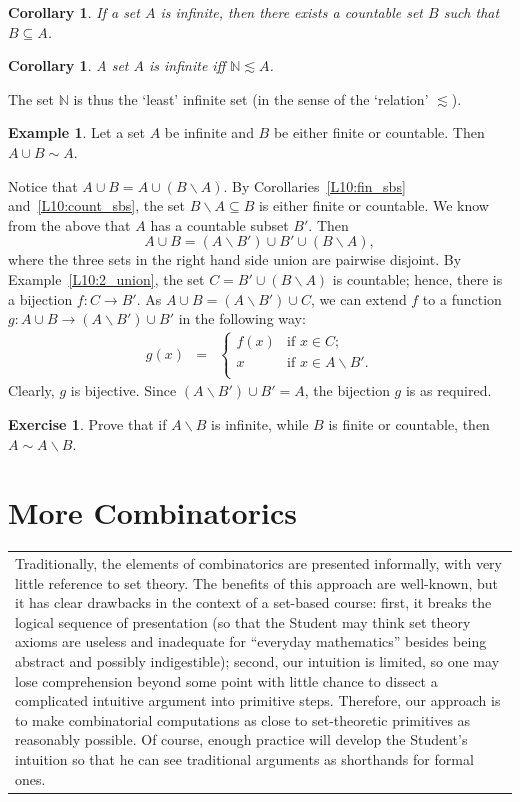 \documentclass[12pt,notitlepage]{article}
\theoremstyle{plain}
\newtheorem{corr}[thm]{Corollary}
\theoremstyle{definition}
\newtheorem{exc}[thm]{Exercise}
\newtheorem{exm}[thm]{Example}
\theoremstyle{plain}
\newcommand{\N}{\mathbb{N}}
\newcommand{\sbs}{\subseteq}
\renewcommand{\setminus}{\smallsetminus}
\newcommand{\1}{\mathbf{1}}
\newcommand{\0}{\mathbf{0}}
\newcommand{\mcomm}[1]{
\medskip\noindent\begin{tabular}{| l}
\parbox{0.99\textwidth}{{\small
#1 }}\end{tabular}
\smallskip}
\begin{document}
\begin{corr}
If a set $A$ is infinite, then there exists a countable set $B$ such that $B \sbs A$.
\end{corr}

\begin{corr}\label{L10:min_inf_corr}
A set $A$ is infinite iff $\N \lesssim A$.
\end{corr}
\noindent The set $\N$ is thus the `least' infinite set (in the sense of the `relation' ${\lesssim}$).

\begin{exm}
Let a set $A$ be infinite and $B$ be either finite or countable. Then $A \cup B \sim A$.

Notice that $A \cup B = A \cup (B \setminus A)$. By Corollaries~\ref{L10:fin_sbs} and~\ref{L10:count_sbs}, the set $B \setminus A \sbs B$ is either finite or countable. We know from the above that $A$ has a countable subset $B'$. Then
$$A \cup B = (A \setminus B') \cup B' \cup (B \setminus A),$$
where the three sets in the right hand side union are pairwise disjoint. By Example~\ref{L10:2_union}, the set $C = B' \cup (B \setminus A)$ is countable; hence, there is a bijection $f\colon C \to B'$. As $A \cup B = (A \setminus B') \cup C$, we can extend $f$ to a function $g\colon A \cup B \to (A \setminus B') \cup B'$ in the following way:
$$
\begin{array}{rcll}
g(x) &=& \begin{cases}
			f(x)&\mbox{if } x \in C;\\
			x&\mbox{if } x \in A \setminus B'.\\
		\end{cases}
\end{array}
$$
Clearly, $g$ is bijective. Since $(A \setminus B') \cup B' = A$, the bijection $g$ is as required.
\end{exm}

\begin{exc}
Prove that if $A \setminus B$ is infinite, while $B$ is finite or countable, then $A \sim A \setminus B$.
\end{exc}

\section{More Combinatorics}
\mcomm{Traditionally, the elements of combinatorics are presented informally, with very little reference to set theory. The benefits of this approach are well-known, but it has clear drawbacks in the context of a set-based course: first, it breaks the logical sequence of presentation (so that the Student may think set theory axioms are useless and inadequate for ``everyday mathematics'' besides being abstract and possibly indigestible); second, our intuition is limited, so one may lose comprehension beyond some point with little chance to dissect a complicated intuitive argument into primitive steps. Therefore, our approach is to make combinatorial computations as close to set-theoretic primitives as reasonably possible. Of course, enough practice will develop the Student's intuition so that he can see traditional arguments as shorthands for formal ones.}
\end{document}
